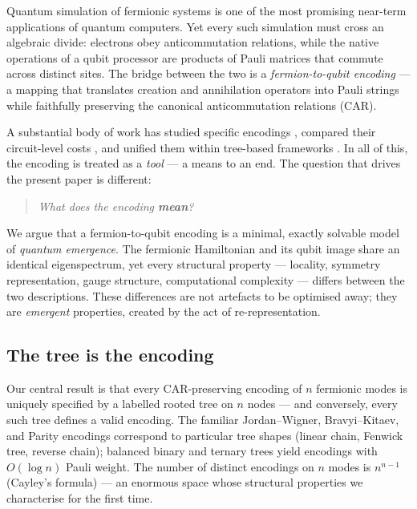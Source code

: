 %

Quantum simulation of fermionic systems is one of the most promising
near-term applications of quantum computers.  Yet every such simulation
must cross an algebraic divide: electrons obey anticommutation relations,
while the native operations of a qubit processor are products of Pauli
matrices that commute across distinct sites.  The bridge between the two
is a \emph{fermion-to-qubit encoding} — a mapping that translates
creation and annihilation operators into Pauli strings while faithfully
preserving the canonical anticommutation relations (CAR).

A substantial body of work has studied specific encodings
\cite{jordan1928,bravyi2002,seeley2012,tranter2015}, compared their
circuit-level costs \cite{havlicek2017}, and unified them within
tree-based frameworks \cite{steudtner2018,jiang2020,miller2023bonsai}.
In all of this, the encoding is treated as a \emph{tool} — a means to
an end.  The question that drives the present paper is different:

\begin{quote}
\itshape
What does the encoding \textbf{mean}?
\end{quote}

We argue that a fermion-to-qubit encoding is a minimal, exactly solvable
model of \emph{quantum emergence}.  The fermionic Hamiltonian and its
qubit image share an identical eigenspectrum, yet every structural
property — locality, symmetry representation, gauge structure,
computational complexity — differs between the two descriptions.
These differences are not artefacts to be optimised away; they are
\emph{emergent} properties, created by the act of re-representation.



\subsection*{The tree is the encoding}

Our central result is that every CAR-preserving encoding of $n$
fermionic modes is uniquely specified by a labelled rooted tree on $n$
nodes — and conversely, every such tree defines a valid encoding.  The
familiar Jordan--Wigner, Bravyi--Kitaev, and Parity encodings
correspond to particular tree shapes (linear chain, Fenwick tree,
reverse chain); balanced binary and ternary trees yield encodings with
$O(\log n)$ Pauli weight.  The number of distinct encodings on $n$
modes is $n^{n-1}$ (Cayley's formula) — an enormous space whose
structural properties we characterise for the first time.

